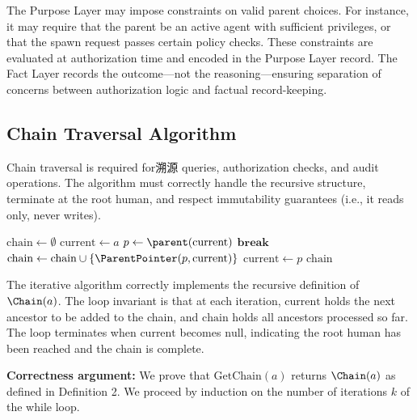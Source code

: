 The Purpose Layer may impose constraints on valid parent choices. For instance, it may require that the parent be an active agent with sufficient privileges, or that the spawn request passes certain policy checks. These constraints are evaluated at authorization time and encoded in the Purpose Layer record. The Fact Layer records the outcome—not the reasoning—ensuring separation of concerns between authorization logic and factual record-keeping.

\subsection{Chain Traversal Algorithm}

Chain traversal is required for溯源 queries, authorization checks, and audit operations. The algorithm must correctly handle the recursive structure, terminate at the root human, and respect immutability guarantees (i.e., it reads only, never writes).

\begin{algorithm}[tb]
\caption{Chain Traversal: Compute Ancestral Chain}
\label{algo:chain-traversal}
\begin{algorithmic}
    \State $\text{chain} \gets \emptyset$
    \State $\text{current} \gets a$
        \State $p \gets \parent(\text{current})$
            \State {}
            \State $\textbf{break}$
        \EndIf
        \State $\text{chain} \gets \text{chain} \cup \{ \ParentPointer(p, \text{current}) \}$
        \State $\text{current} \gets p$
    \EndWhile
    \State \Return $\text{chain}$
\EndProcedure
\end{algorithmic}
\end{algorithm}

The iterative algorithm correctly implements the recursive definition of $\Chain(a)$. The loop invariant is that at each iteration, $\text{current}$ holds the next ancestor to be added to the chain, and $\text{chain}$ holds all ancestors processed so far. The loop terminates when $\text{current}$ becomes $\text{null}$, indicating the root human has been reached and the chain is complete.

\textbf{Correctness argument:} We prove that $\text{GetChain}(a)$ returns $\Chain(a)$ as defined in Definition 2. We proceed by induction on the number of iterations $k$ of the while loop.

